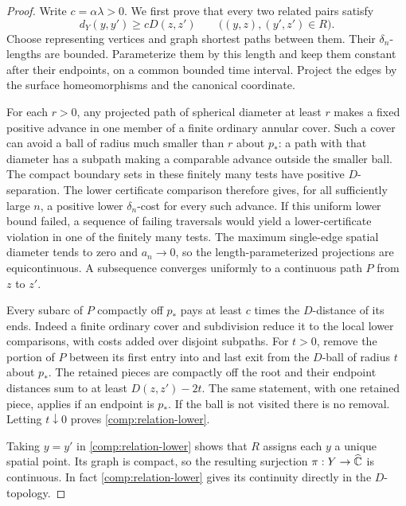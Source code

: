 \begin{proof}
Write $c=\alpha\lambda>0$.  We first prove that every two related
pairs satisfy
\begin{equation}
 \label{comp:relation-lower}
 d_Y(y,y')\ge cD(z,z')
 \qquad\bigl((y,z),(y',z')\in R\bigr).
\end{equation}
Choose representing vertices and graph shortest paths between them.
Their $\delta_n$-lengths are bounded.  Parameterize them by this
length and keep them constant after their endpoints, on a common
bounded time interval.  Project the edges by the surface
homeomorphisms and the canonical coordinate.

For each $r>0$, any projected path of spherical diameter at least
$r$ makes a fixed positive advance in one member of a finite
ordinary annular cover.  Such a cover can avoid a ball of radius
much smaller than $r$ about $p_*$: a path with that diameter has a
subpath making a comparable advance outside the smaller ball.
The compact boundary sets in these finitely many tests have
positive $D$-separation.  The lower certificate comparison therefore
gives, for all sufficiently large $n$, a positive lower
$\delta_n$-cost for every such advance.  If this uniform lower
bound failed, a sequence of failing traversals would yield a
lower-certificate violation in one of the finitely many tests.
The maximum single-edge spatial diameter tends to zero and
$a_n\to0$, so the length-parameterized projections are
equicontinuous.  A subsequence converges uniformly to a continuous
path $P$ from $z$ to $z'$.

Every subarc of $P$ compactly off $p_*$ pays at least $c$ times the
$D$-distance of its ends.  Indeed a finite ordinary cover and
subdivision reduce it to the local lower comparisons, with costs
added over disjoint subpaths.  For $t>0$, remove the portion of $P$
between its first entry into and last exit from the $D$-ball of
radius $t$ about $p_*$.  The retained pieces are compactly off the
root and their endpoint distances sum to at least
$D(z,z')-2t$.  The same statement, with one retained piece, applies
if an endpoint is $p_*$.  If the ball is not visited there is no
removal.  Letting $t\downarrow0$ proves
\eqref{comp:relation-lower}.

Taking $y=y'$ in \eqref{comp:relation-lower} shows that $R$ assigns
each $y$ a unique spatial point.  Its graph is compact, so the
resulting surjection $\pi:Y\to\widehat{\mathbb C}$ is continuous.  In fact
\eqref{comp:relation-lower} gives its continuity directly in the
$D$-topology.


\end{proof}
